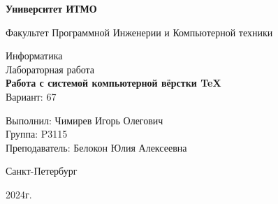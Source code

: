 \thispagestyle{empty}
\begin{center}
    \textbf{Университет ИТМО}

    \vspace{1em}
    Факультет Программной Инженерии и Компьютерной техники

    \vspace{20em}
    
    {\Large Информатика}\\[1em]
    {\Large Лабораторная работа }\\[1em]
    {\Large \textbf{Работа с системой компьютерной вёрстки \TeX}}\\[1em]
    Вариант: 67
\end{center}

\vspace{12em}

\begin{flushright}
    Выполнил:
    Чимирев Игорь Олегович\\
    Группа: P3115\\
    Преподаватель:
    Белокон Юлия Алексеевна \\
\end{flushright}
\vspace{8em}
\vspace{\fill}

\begin{center}
Санкт-Петербург

2024г.
\end{center}